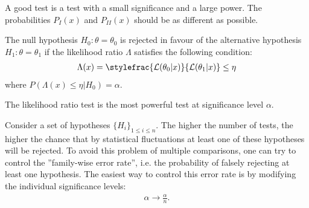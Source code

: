 {    

    \begin{remark}
        A good test is a test with a small significance and a large power. The probabilities $P_I(x)$ and $P_{II}(x)$ should be as different as possible.
    \end{remark}

    \begin{definition}
        The null hypothesis $H_0:\theta=\theta_0$ is rejected in favour of the alternative hypothesis $H_1:\theta=\theta_1$ if the likelihood ratio $\Lambda$ satisfies the following condition:
        \begin{gather}
            \label{statistics:likelihood_ratio}
            \Lambda(x) = \stylefrac{\mathcal{L}(\theta_0|x)}{\mathcal{L}(\theta_1|x)} \leq \eta
        \end{gather}
        where $P(\Lambda(x)\leq\eta|H_0) = \alpha $.
    \end{definition}
    \begin{theorem}
        The likelihood ratio test is the most powerful test at significance level $\alpha$.
    \end{theorem}

    \begin{construct}
        Consider a set of hypotheses $\{H_i\}_{1\leq i\leq n}$. The higher the number of tests, the higher the chance that by statistical fluctuations at least one of these hypotheses will be rejected. To avoid this problem of multiple comparisons, one can try to control the ''family-wise error rate'', i.e. the probability of falsely rejecting at least one hypothesis. The easiest way to control this error rate is by modifying the individual significance levels:
        \begin{gather}
            \alpha\longrightarrow\frac{\alpha}{n}.
        \end{gather}
    \end{construct}

}
